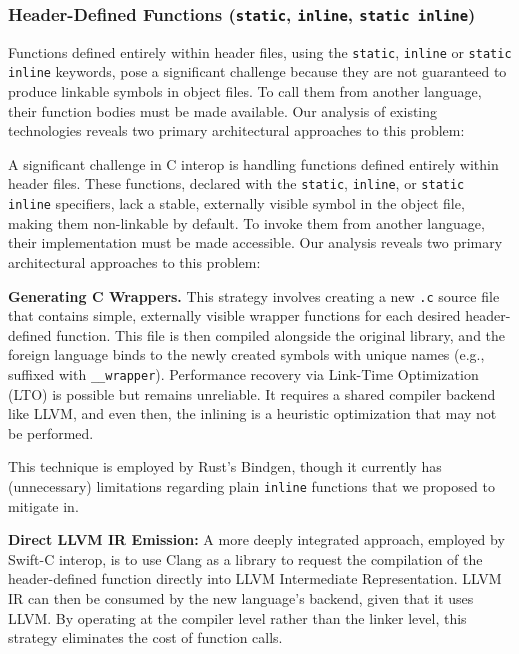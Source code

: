 \subsubsection{Header-Defined Functions (\texttt{static}, \texttt{inline}, \texttt{static inline})}
\label{handling_inline_c_functions}

Functions defined entirely within header files, using the \texttt{static}, \texttt{inline} or \texttt{static inline} keywords, pose a significant challenge because they are not guaranteed to produce linkable symbols in object files. To call them from another language, their function bodies must be made available. Our analysis of existing technologies reveals two primary architectural approaches to this problem:

A significant challenge in C interop is handling functions defined entirely within header files. These functions, declared with the \texttt{static}, \texttt{inline}, or \texttt{static inline} specifiers, lack a stable, externally visible symbol in the object file, making them non-linkable by default. To invoke them from another language, their implementation must be made accessible. Our analysis reveals two primary architectural approaches to this problem:

\textbf{Generating C Wrappers.} This strategy involves creating a new \texttt{.c} source file that contains simple, externally visible wrapper functions for each desired header-defined function. This file is then compiled alongside the original library, and the foreign language binds to the newly created symbols with unique names (e.g., suffixed with \texttt{\_\_wrapper}). Performance recovery via Link-Time Optimization (LTO) is possible but remains unreliable. It requires a shared compiler backend like LLVM, and even then, the inlining is a heuristic optimization that may not be performed.

This technique is employed by Rust's Bindgen, though it currently has (unnecessary) limitations regarding plain \texttt{inline} functions\cite{bindgen-inline-limitation} that we proposed to mitigate in\cite{bindgen-inline-proposal}.

\textbf{Direct LLVM IR Emission:} A more deeply integrated approach, employed by Swift-C interop, is to use Clang as a library to request the compilation of the header-defined function directly into LLVM Intermediate Representation. LLVM IR can then be consumed by the new language's backend, given that it uses LLVM. By operating at the compiler level rather than the linker level, this strategy eliminates the cost of function calls.

